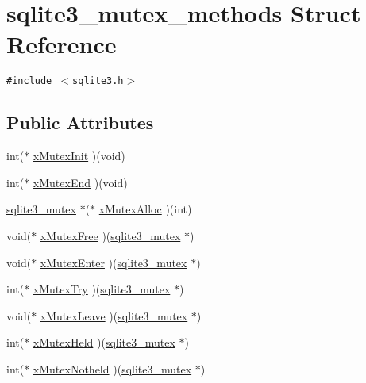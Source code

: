 \hypertarget{structsqlite3__mutex__methods}{
\section{sqlite3\_\-mutex\_\-methods Struct Reference}
\label{structsqlite3__mutex__methods}
}
{\tt \#include $<$sqlite3.h$>$}

\subsection*{Public Attributes}
\begin{CompactItemize}
\item 
int($\ast$ \hyperlink{structsqlite3__mutex__methods_f0a78d79b6029444d4a2ac7c474030d4}{xMutexInit} )(void)
\item 
int($\ast$ \hyperlink{structsqlite3__mutex__methods_4963efb4bfede244d4d2a14510dbfe68}{xMutexEnd} )(void)
\item 
\hyperlink{sqlite3_8h_0f546860bde03fddb33a9fed920da05c}{sqlite3\_\-mutex} $\ast$($\ast$ \hyperlink{structsqlite3__mutex__methods_6c99ad4448a6c269f80074e6645eb4a6}{xMutexAlloc} )(int)
\item 
void($\ast$ \hyperlink{structsqlite3__mutex__methods_4e58d446a7225ce91073eb0af91d219a}{xMutexFree} )(\hyperlink{sqlite3_8h_0f546860bde03fddb33a9fed920da05c}{sqlite3\_\-mutex} $\ast$)
\item 
void($\ast$ \hyperlink{structsqlite3__mutex__methods_c60f7bb165e9770949a8a2b2c2632830}{xMutexEnter} )(\hyperlink{sqlite3_8h_0f546860bde03fddb33a9fed920da05c}{sqlite3\_\-mutex} $\ast$)
\item 
int($\ast$ \hyperlink{structsqlite3__mutex__methods_45682df41bdfcb267a696090c80ebd06}{xMutexTry} )(\hyperlink{sqlite3_8h_0f546860bde03fddb33a9fed920da05c}{sqlite3\_\-mutex} $\ast$)
\item 
void($\ast$ \hyperlink{structsqlite3__mutex__methods_cfa193f9130bfc68caf7f1849bcd0dac}{xMutexLeave} )(\hyperlink{sqlite3_8h_0f546860bde03fddb33a9fed920da05c}{sqlite3\_\-mutex} $\ast$)
\item 
int($\ast$ \hyperlink{structsqlite3__mutex__methods_5d30a95c614bc08fe156c9ea0f0d88e8}{xMutexHeld} )(\hyperlink{sqlite3_8h_0f546860bde03fddb33a9fed920da05c}{sqlite3\_\-mutex} $\ast$)
\item 
int($\ast$ \hyperlink{structsqlite3__mutex__methods_7bc1edfd01c67c6dcee26299bc31a7bf}{xMutexNotheld} )(\hyperlink{sqlite3_8h_0f546860bde03fddb33a9fed920da05c}{sqlite3\_\-mutex} $\ast$)
\end{CompactItemize}


